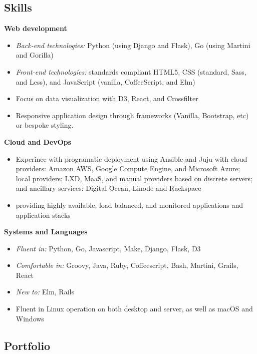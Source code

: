 \subsection{Skills}

\textbf{Web development}

\begin{itemize}
    \item \textit{Back-end technologies:} Python (using Django and Flask), Go (using Martini and Gorilla)
    \item \textit{Front-end technologies:} standards compliant HTML5, CSS (standard, Sass, and Less), and JavaScript (vanilla, CoffeeScript, and Elm)
    \item Focus on data visualization with D3, React, and Crossfilter
    \item Responsive application design through frameworks (Vanilla, Bootstrap, etc) or bespoke styling.
\end{itemize}

\hspace{-1.5em}\textbf{Cloud and DevOps}

\begin{itemize}
    \item Experince with programatic deployment using Ansible and Juju with cloud providers: Amazon AWS, Google Compute Engine, and Microsoft Azure; local providers: LXD, MaaS, and manual providers based on discrete servers; and ancillary services: Digital Ocean, Linode and Rackspace
    \item providing highly available, load balanced, and monitored applications and application stacks
\end{itemize}

\hspace{-1.5em}\textbf{Systems and Languages}

\begin{itemize}
    \item \textit{Fluent in:} Python, Go, Javascript, Make, Django, Flask, D3
    \item \textit{Comfortable in:} Groovy, Java, Ruby, Coffeescript, Bash, Martini, Grails, React
    \item \textit{New to:} Elm, Rails
    \item Fluent in Linux operation on both desktop and server, as well as macOS and Windows
\end{itemize}

\subsection{Portfolio}

